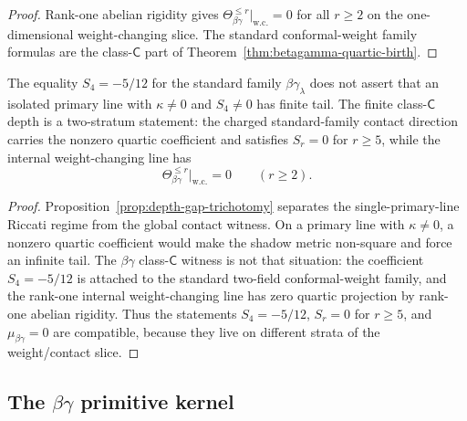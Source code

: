 \begin{proof}
Rank-one abelian rigidity gives
$\Theta_{\beta\gamma}^{\le r}\big|_{\mathrm{w.c.}} = 0$
for all $r \ge 2$ on the one-dimensional weight-changing slice.
The standard conformal-weight family formulas are the class-$\mathsf C$
part of Theorem~\ref{thm:betagamma-quartic-birth}.
\end{proof}

\begin{proposition}
\label{prop:betagamma-class-c-stratum-separation}
\ClaimStatusConditional
{}
The equality $S_4=-5/12$ for the standard family
$\beta\gamma_\lambda$ does not assert that an isolated primary line
with $\kappa\neq0$ and $S_4\neq0$ has finite tail. The finite
class-$\mathsf C$ depth is a two-stratum statement: the charged
standard-family contact direction carries the nonzero quartic
coefficient and satisfies $S_r=0$ for $r\ge5$, while the internal
weight-changing line has
\[
 \Theta_{\beta\gamma}^{\le r}\big|_{\mathrm{w.c.}}=0
 \qquad (r\ge2).
\]
\end{proposition}

\begin{proof}
Proposition~\ref{prop:depth-gap-trichotomy} separates the
single-primary-line Riccati regime from the global contact witness.
On a primary line with $\kappa\neq0$, a nonzero quartic coefficient
would make the shadow metric non-square and force an infinite tail.
The $\beta\gamma$ class-$\mathsf C$ witness is not that situation:
the coefficient $S_4=-5/12$ is attached to the standard two-field
conformal-weight family, and the rank-one internal weight-changing
line has zero quartic projection by rank-one abelian rigidity. Thus
the statements $S_4=-5/12$, $S_r=0$ for $r\ge5$, and
$\mu_{\beta\gamma}=0$ are compatible, because they live on different
strata of the weight/contact slice.\qedhere
\end{proof}

\subsection{The \texorpdfstring{$\beta\gamma$}{beta-gamma} primitive kernel}
\label{subsec:betagamma-primitive-kernel}

